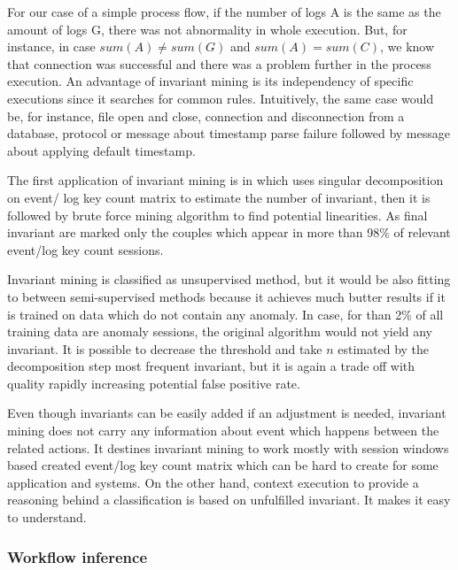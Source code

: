 For our case of a simple process flow, if the number of logs A is the same as the amount of logs G, there was not  abnormality in whole execution. But, for instance, in case $sum(A) \neq sum(G)$ and $sum(A) = sum(C)$, we know that connection was successful and there was a problem further in the process execution. An advantage of invariant mining is its independency of specific executions since it searches for common rules. Intuitively, the same case would be, for instance, file open and close, connection and disconnection from a database,  protocol or message about timestamp parse failure followed by message about applying default timestamp. 

The first application of invariant mining is in \cite{lou2010mining} which uses singular decomposition on event/ log key count matrix to estimate the number of invariant, then it is followed by brute force mining algorithm to find potential linearities. As final invariant are marked only the couples which appear in more than 98\% of relevant event/log key count sessions.

Invariant mining is classified as  unsupervised method, but it would be also fitting to between semi-supervised methods because it achieves much butter results if it is trained on data which do not contain any anomaly. In case, for than 2\%  of all training data are anomaly sessions, the original algorithm would not yield any invariant. It is possible to decrease the threshold and take $n$\ms{,} estimated by the decomposition step\ms{,} most frequent invariant, but it is again a trade off with quality rapidly increasing potential false positive rate.

Even though invariants can be easily added if an adjustment is needed, invariant mining does not carry any information about event which happens between the related actions. It destines invariant mining to work mostly with session windows based created event/log key count matrix which can be hard to create for some application and systems. On the other hand, context execution to provide a reasoning behind a classification is based on un\ms{/}fulfilled invariant. It makes it easy to understand.

\subsubsection{Workflow inference}


